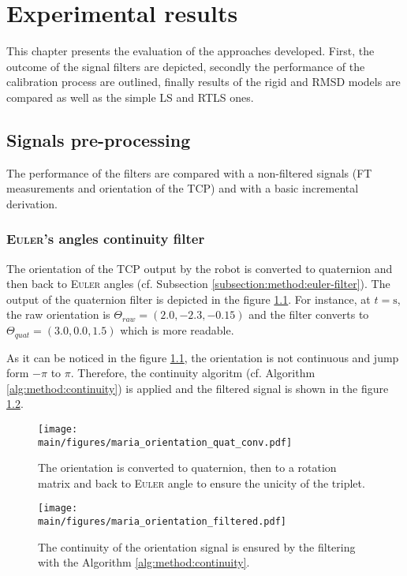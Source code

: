 \documentclass[/home/francois/latex/report/main.tex]{subfiles}
\begin{document}
\chapter{Experimental results}
\label{chapter:results}

This chapter presents the evaluation of the approaches developed. First, the outcome of the signal filters are depicted, secondly the performance of the calibration process are outlined, finally results of the rigid and \ac{RMSD} models are compared as well as the simple \ac{LS} and \ac{RTLS} ones.

\section{Signals pre-processing}
\label{section:results:pre-processing}

The performance of the filters are compared with a non-filtered signals (\ac{FT} measurements and orientation of the \ac{TCP}) and with a basic incremental derivation.

\subsection{\textsc{Euler}'s angles continuity filter}

The orientation of the \ac{TCP} output by the robot is converted to quaternion and then back to \textsc{Euler} angles (cf. Subsection \ref{subsection:method:euler-filter}). The output of the quaternion filter is depicted in the figure \ref{fig:results:quat-conv}. For instance, at $t = \si{\second}$, the raw orientation is $\Theta_{raw} = (2.0, -2.3, -0.15)$ and the filter converts to  $\Theta_{quat} = (3.0, 0.0, 1.5)$ which is more readable.

As it can be noticed in the figure \ref{fig:results:quat-conv}, the orientation is not continuous and jump form $-\pi$ to $\pi$. Therefore, the continuity algoritm (cf. Algorithm \ref{alg:method:continuity}) is applied and the filtered signal is shown in the figure \ref{fig:results:orientation-filtered}.

\begin{figure}[h]
  \centering
  \texttt{[image: \\main/figures/maria\_orientation\_quat\_conv.pdf]}
  \caption{The orientation is converted to quaternion, then to a rotation matrix and back to \textsc{Euler} angle to ensure the unicity of the triplet.}
  \label{fig:results:quat-conv}
\end{figure}

\begin{figure}[h]
  \centering
  \texttt{[image: \\main/figures/maria\_orientation\_filtered.pdf]}
  \caption{The continuity of the orientation signal is ensured by the filtering with the Algorithm \ref{alg:method:continuity}.}
  \label{fig:results:orientation-filtered}
\end{figure}
\end{document}

